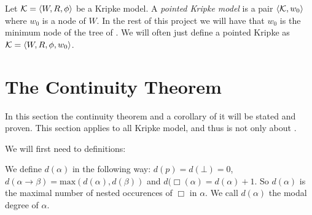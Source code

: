 \documentclass[../main.tex]{subfiles}
\begin{document}
\begin{defi}
	Let $\mathcal{K}=\langle W,R,\phi\rangle$ be a Kripke model. A \textit{pointed
	Kripke model} is a pair $\langle \mathcal{K},w_0\rangle$ where $w_0$ is a node
	of $W$. In the rest of this project we will have that $w_0$ is the
	minimum node of the tree of \GL. We will often just define a pointed
	Kripke as $\mathcal{K}=\langle W,R,\phi,w_0\rangle$.
\end{defi}

\section{The Continuity Theorem}
In this section the continuity theorem and a corollary of it will be stated and
proven. This section applies to all Kripke model, and thus is not only about
\GL.

We will first need to definitions:
\begin{defi}
	We define $d(\alpha)$ in the following way: $d(p)=d(\bot)=0$,
	$d(\alpha\rightarrow\beta)=\text{max}(d(\alpha),d(\beta))$ and
	$d(\Box(\alpha)=d(\alpha)+1$. So $d(\alpha)$ is the maximal number of
	nested occurences of $\Box$ in $\alpha$. We call $d(\alpha)$ the modal
	degree of $\alpha$.
\end{defi}
\end{document}
